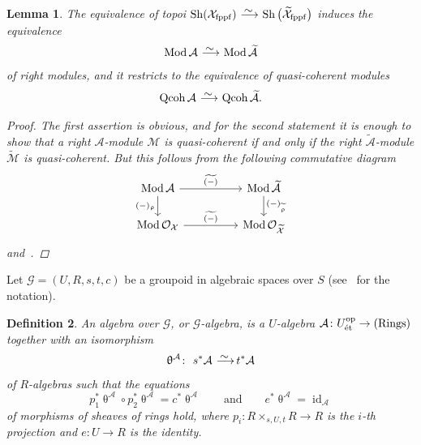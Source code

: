 \documentclass[11pt]{article}
\numberwithin{equation}{section}
\newtheorem{dfn}{Definition}[section]
\newtheorem{lem}[dfn]{Lemma}
\numberwithin{equation}{section}
\newcommand{\Qcoh}{\operatorname{Qcoh}}
\newcommand{\Mod}{\operatorname{Mod}}
\newcommand{\id}{\operatorname{id}}
\newcommand{\fppf}{\operatorname{fppf}}
\newcommand{\Rings}{\operatorname{Rings}}
\newcommand{\op}{\operatorname{op}}
\newcommand{\Sh}{\operatorname{Sh}}
\newcommand{\et}{\text{\rm \'et}}
\newcommand{\cA}{\mathcal{A}}
\newcommand{\cG}{\mathcal{G}}
\newcommand{\cM}{\mathcal{M}}
\newcommand{\cO}{\mathcal{O}}
\newcommand{\cX}{\mathcal{X}}
\newcommand{\simto}{\,\,\,\,\raisebox{4pt}{$\sim$}{\kern -1.1em \longrightarrow}\,}
\begin{document}
\begin{lem}\label{stackification equiv}
The equivalence of topoi $\Sh(\cX_{\fppf})\simto \Sh\big(\widetilde{\cX}_{\fppf}\big)$ induces the equivalence
\begin{gather*}
\Mod\cA\simto \Mod\widetilde{\cA}
\end{gather*}
of right modules, and it restricts to the equivalence of quasi-coherent modules
\begin{gather*}
\Qcoh\cA\simto \Qcoh\widetilde{\cA}.
\end{gather*}
\begin{proof}
The first assertion is obvious, and for the second statement it is enough to show that a right $\cA$-module $\cM$ is quasi-coherent if and only if the right $\widetilde{\cA}$-module $\widetilde{\cM}$ is quasi-coherent. But this follows from the following commutative diagram
\[
\begin{tikzcd}
\Mod\cA\arrow[rr,"\widetilde{(-)}"]\arrow[d,"(-)_{\uprho}"']&&\Mod\widetilde{\cA}\arrow[d," (-)_{\widetilde{\uprho}}"]\\
\Mod\cO_{\cX}\arrow[rr, "\widetilde{(-)}"]&&\Mod\cO_{\widetilde{\cX}}
\end{tikzcd}
\]
and~\cite[Lemma~12.2; 06WR]{stacks}.
\end{proof}
\end{lem}


Let $\cG=(U,R,s,t, c)$ be a groupoid in algebraic spaces over $S$ (see~\cite[Definition 11.1; 043W]{stacks} for the notation).


\begin{dfn}
 An {\it algebra over $\cG$}, or {\it $\cG$-algebra}, is a $U$-algebra $\cA\colon U_{\et}^{\op}\to (\Rings)$ together with an isomorphism
\begin{gather*}
\uptheta^{\cA}\colon\ s^*\cA\simto t^*\cA
\end{gather*}
of $R$-algebras such that the equations
\begin{equation}\label{groupoid alg}
p_1^*\uptheta^{\cA}\circ p_2^*\uptheta^{\cA}=c^*\uptheta^{\cA}
\qquad\text{and}\qquad
e^*\uptheta^{\cA}=\id_{\cA}
\end{equation}
of morphisms of sheaves of rings hold, where $p_i\colon R\times_{s,U,t}R \to R$ is the $i$-th projection and $e\colon U\to R$ is the identity.
\end{dfn}
\end{document}
